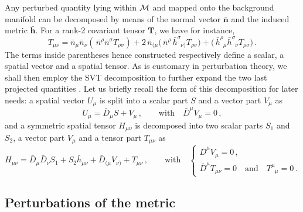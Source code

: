 \documentclass[notitlepage,onecolumn,floatfix,preprintnumbers,aps,prd,showpacs,nofootinbib,amsmath,amssymb,amsfonts]{revtex4-1}
\newcommand{\be}{\begin{equation}}
\newcommand{\ee}{\end{equation}}
\newcommand{\<}{\langle}
\renewcommand{\>}{\rangle}
\begin{document}
Any perturbed quantity lying within $\cal M$ and mapped onto the background manifold can be decomposed 
by means of the normal vector $\bm{\bar n}$ and the induced metric $\bm{\bar h}$. 
For a rank-2 covariant tensor $\bm T$, we have for instance, 
\be
	T_{\mu \nu} 
		= \bar n_\mu \bar n_\nu \left( \, \bar n^\rho \bar n^\sigma T_{\rho \sigma} \right) 
		+ 2 \, \bar n_{( \mu} \big( \, \bar n^\rho \, \bar h^{\sigma}_{\phantom{\sigma} \nu )} T_{\rho \sigma} \big) 
		+ \big( \, \bar h^{\rho}_{\phantom{\rho} \mu} \bar h^{\sigma}_{\phantom{\sigma} \nu} T_{\rho \sigma} \big) \, .
\ee
The terms inside parentheses hence constructed respectively define a scalar, a spatial vector and a spatial tensor. 
As is customary in perturbation theory, we shall then employ the SVT decomposition to 
further expand the two last projected quantities \cite{Bardeen:1980kt}. 
%
Let us briefly recall the form of this decomposition for later needs: 
a spatial vector $U_\mu$ is split into a scalar part $S$ and a vector part $V_\mu$ as 
\be
	U_\mu = \bar D_\mu S + V_\mu \, , \qquad 
		\mathrm{with} \quad 
	\bar D^\mu V_\mu = 0 \, ,
\ee
and a symmetric spatial tensor $H_{\mu\nu}$ is decomposed into two
scalar parts $S_1$ and $S_2$, a vector part $V_\mu$ 
and a tensor part $T_{\mu \nu}$ as 
\be
	H_{\mu\nu} 
		= \bar D_\mu \bar D_\nu S_1 + S_2 \bar h_{\mu\nu}  
		+ \bar D_{(\mu} V_{\nu)} + T_{\mu\nu} \, , \qquad 
	\mathrm{with} \quad
	\left\{
		\begin{array}{l}
			\bar D^\mu V_\mu = 0 \, , \\ 
			\bar D^\mu T_{\mu\nu} = 0 \quad \mathrm{and} \quad T^\mu_{\phantom{\mu} \mu} = 0 \, . 
		\end{array}
	\right.
\ee

\subsection{Perturbations of the metric} \label{subsec:pert_met}
\end{document}
